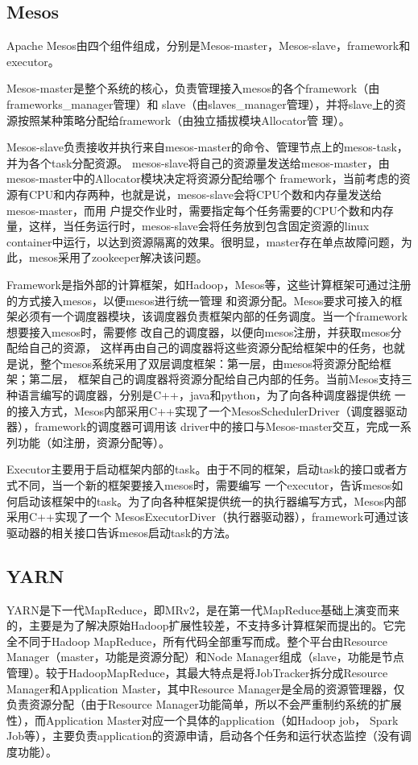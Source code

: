\subsection{Mesos}

Apache Mesos由四个组件组成，分别是Mesos-master，Mesos-slave，framework和executor。

Mesos-master是整个系统的核心，负责管理接入mesos的各个framework（由frameworks\_manager管理）和 slave（由slaves\_manager管理），并将slave上的资源按照某种策略分配给framework（由独立插拔模块Allocator管 理）。

Mesos-slave负责接收并执行来自mesos-master的命令、管理节点上的mesos-task，并为各个task分配资源。 mesos-slave将自己的资源量发送给mesos-master，由mesos-master中的Allocator模块决定将资源分配给哪个 framework，当前考虑的资源有CPU和内存两种，也就是说，mesos-slave会将CPU个数和内存量发送给mesos-master，而用 户提交作业时，需要指定每个任务需要的CPU个数和内存量，这样，当任务运行时，mesos-slave会将任务放到包含固定资源的linux container中运行，以达到资源隔离的效果。很明显，master存在单点故障问题，为此，mesos采用了zookeeper解决该问题。

Framework是指外部的计算框架，如Hadoop，Mesos等，这些计算框架可通过注册的方式接入mesos，以便mesos进行统一管理 和资源分配。Mesos要求可接入的框架必须有一个调度器模块，该调度器负责框架内部的任务调度。当一个framework想要接入mesos时，需要修 改自己的调度器，以便向mesos注册，并获取mesos分配给自己的资源， 这样再由自己的调度器将这些资源分配给框架中的任务，也就是说，整个mesos系统采用了双层调度框架：第一层，由mesos将资源分配给框架；第二层， 框架自己的调度器将资源分配给自己内部的任务。当前Mesos支持三种语言编写的调度器，分别是C++，java和python，为了向各种调度器提供统 一的接入方式，Mesos内部采用C++实现了一个MesosSchedulerDriver（调度器驱动器），framework的调度器可调用该 driver中的接口与Mesos-master交互，完成一系列功能（如注册，资源分配等）。

Executor主要用于启动框架内部的task。由于不同的框架，启动task的接口或者方式不同，当一个新的框架要接入mesos时，需要编写 一个executor，告诉mesos如何启动该框架中的task。为了向各种框架提供统一的执行器编写方式，Mesos内部采用C++实现了一个 MesosExecutorDiver（执行器驱动器），framework可通过该驱动器的相关接口告诉mesos启动task的方法。

\subsection{YARN}
YARN是下一代MapReduce，即MRv2，是在第一代MapReduce基础上演变而来的，主要是为了解决原始Hadoop扩展性较差，不支持多计算框架而提出的。它完全不同于Hadoop MapReduce，所有代码全部重写而成。整个平台由Resource Manager（master，功能是资源分配）和Node Manager组成（slave，功能是节点管理）。较于HadoopMapReduce，其最大特点是将JobTracker拆分成Resource Manager和Application Master，其中Resource Manager是全局的资源管理器，仅负责资源分配（由于Resource Manager功能简单，所以不会严重制约系统的扩展性），而Application Master对应一个具体的application（如Hadoop job， Spark Job等），主要负责application的资源申请，启动各个任务和运行状态监控（没有调度功能）。

